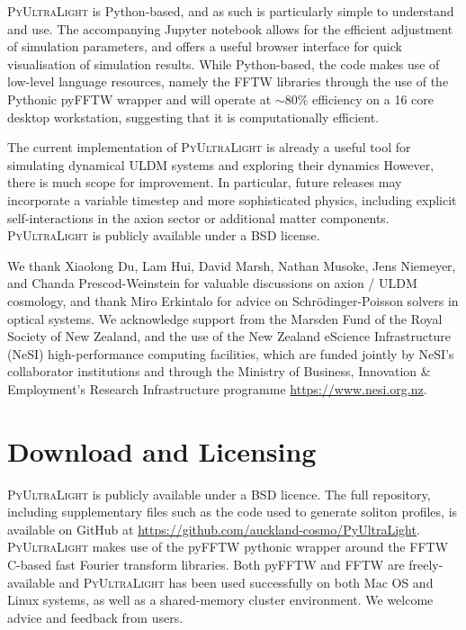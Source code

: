 \documentclass[a4paper,11pt]{article}
\newcommand{\PyUltraLight}{\textsc{PyUltraLight}\xspace}
\begin{document}
\PyUltraLight is Python-based, and as such is particularly simple to understand and use. The accompanying Jupyter notebook allows for the efficient adjustment of simulation parameters, and offers a useful browser interface for quick visualisation of simulation results. While Python-based, the code makes use of low-level language resources, namely the FFTW libraries through the use of the Pythonic pyFFTW wrapper and will operate at $\sim 80\%$ efficiency on a 16 core desktop workstation, suggesting that it is computationally efficient. 

The current implementation of \PyUltraLight is already a useful tool for simulating dynamical ULDM systems and exploring their dynamics However, there is much scope for  improvement. In particular, future releases may incorporate a variable timestep and more sophisticated physics, including explicit self-interactions in the axion sector or additional matter components. \PyUltraLight is publicly available under a BSD license. 

\acknowledgments

We thank Xiaolong Du, Lam Hui, David Marsh, Nathan Musoke, Jens Niemeyer, and Chanda Prescod-Weinstein for valuable discussions on axion / ULDM cosmology, and thank Miro Erkintalo for advice on Schr{\"o}dinger-Poisson solvers  in optical systems.  We acknowledge support from the Marsden Fund of the Royal Society of New Zealand, and  the use of the New Zealand eScience Infrastructure (NeSI) high-performance computing facilities, which are funded jointly by NeSI's collaborator institutions and through the Ministry of Business, Innovation \& Employment's Research Infrastructure programme \url{https://www.nesi.org.nz}. 


\appendix
\section{Download and Licensing}

\PyUltraLight is publicly available under a BSD licence. The full repository, including supplementary files such as the code used to generate soliton profiles, is available on GitHub at {\url{https://github.com/auckland-cosmo/PyUltraLight}}. \PyUltraLight makes use of the pyFFTW pythonic wrapper around the FFTW C-based fast Fourier transform libraries. Both pyFFTW and FFTW are freely-available and \PyUltraLight has been used successfully on both Mac OS and Linux systems, as well as a shared-memory cluster environment. We welcome advice and feedback from users. 
\end{document}
